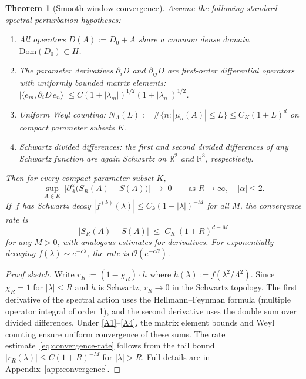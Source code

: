 \documentclass[12pt,a4paper]{article}
\theoremstyle{plain}
\newtheorem{theorem}{Theorem}[section]
\theoremstyle{definition}
\theoremstyle{remark}
\newcommand{\R}{\mathbb{R}}
\newcommand{\Lam}{\Lambda}
\newcommand{\order}{\mathcal{O}}
\begin{document}
\begin{theorem}[Smooth-window convergence]
\label{thm:smooth-convergence}
Assume the following standard spectral-perturbation hypotheses:
\begin{enumerate}[label=\textup{(A\arabic*)},leftmargin=3em]
  \item\label{A1} All operators $D(A) := D_0 + A$ share a common
    dense domain $\mathrm{Dom}(D_0) \subset H$.
  \item\label{A2} The parameter derivatives $\partial_i D$ and
    $\partial_{ij} D$ are first-order differential operators with
    uniformly bounded matrix elements:
    $|\langle e_m, \partial_i D\, e_n\rangle| \le C(1+|\lambda_m|)^{1/2}
    (1+|\lambda_n|)^{1/2}$.
  \item\label{A3} Uniform Weyl counting:
    $N_A(L) := \#\{n : |\mu_n(A)| \le L\} \le C_K(1+L)^d$ on compact
    parameter subsets $K$.
  \item\label{A4} Schwartz divided differences: the first and second
    divided differences of any Schwartz function are again Schwartz on
    $\R^2$ and $\R^3$, respectively.
\end{enumerate}
Then for every compact parameter subset $K$,
\begin{equation}
  \sup_{A \in K}\,\bigl|\partial_A^\alpha\bigl(S_R(A) - S(A)\bigr)\bigr|
  \;\longrightarrow\; 0
  \qquad\text{as } R \to \infty,
  \quad |\alpha| \le 2.
\end{equation}
If\, $f$ has Schwartz decay $|f^{(k)}(\lambda)| \le C_k
(1+|\lambda|)^{-M}$ for all $M$, the convergence rate is
\begin{equation}\label{eq:convergence-rate}
  \bigl|S_R(A) - S(A)\bigr| \;\le\; C_K\,(1+R)^{d-M}
\end{equation}
for any $M > 0$, with analogous estimates for derivatives.  For
exponentially decaying $f(\lambda) \sim e^{-c\lambda}$, the rate is
$\order(e^{-cR})$.
\end{theorem}

\begin{proof}[Proof sketch]
Write $r_R := (1-\chi_R)\cdot h$ where $h(\lambda) :=
f(\lambda^2/\Lam^2)$.  Since $\chi_R = 1$ for $|\lambda| \le R$ and
$h$ is Schwartz, $r_R \to 0$ in the Schwartz topology.  The first
derivative of the spectral action uses the Hellmann--Feynman formula
(multiple operator integral of order 1), and the second derivative
uses the double sum over divided differences.  Under
\ref{A1}--\ref{A4}, the matrix element bounds and Weyl counting
ensure uniform convergence of these sums.  The rate
estimate~\eqref{eq:convergence-rate} follows from the tail bound
$|r_R(\lambda)| \le C(1+R)^{-M}$ for $|\lambda| > R$.  Full
details are in Appendix~\ref{app:convergence}.
\end{proof}
\end{document}
